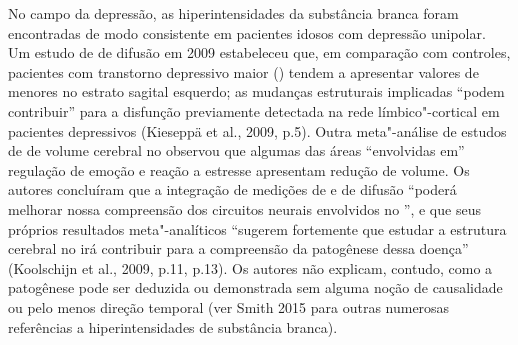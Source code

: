 No campo da depressão, as hiperintensidades da substância branca foram
encontradas de modo consistente em pacientes idosos com depressão
unipolar. Um estudo de  de difusão em 2009 estabeleceu que, em
comparação com controles, pacientes com transtorno depressivo maior
() tendem a apresentar valores de  menores no estrato sagital
esquerdo; as mudanças estruturais implicadas ``podem contribuir'' para a
disfunção previamente detectada na rede límbico"-cortical em pacientes
depressivos (Kieseppä et al., 2009, p.5). Outra meta"-análise de estudos
de  de volume cerebral no  observou que algumas das áreas
``envolvidas em'' regulação de emoção e reação a estresse apresentam
redução de volume. Os autores concluíram que a integração de medições de
 e  de difusão ``poderá melhorar nossa compreensão dos circuitos
neurais envolvidos no '', e que seus próprios resultados
meta"-analíticos ``sugerem fortemente que estudar a estrutura cerebral no
 irá contribuir para a compreensão da patogênese dessa doença''
(Koolschijn et al., 2009, p.11, p.13). Os autores não explicam, contudo,
como a patogênese pode ser deduzida ou demonstrada sem alguma noção de
causalidade ou pelo menos direção temporal (ver Smith 2015 para outras
numerosas referências a hiperintensidades de substância branca).

